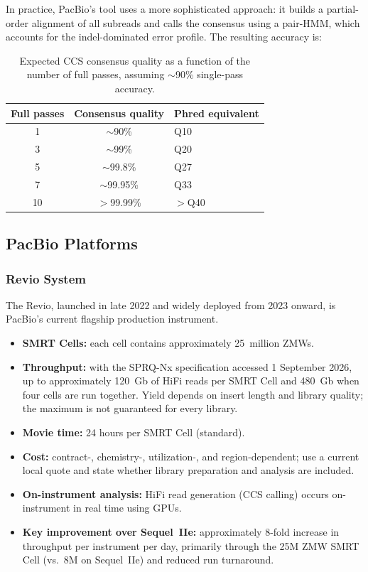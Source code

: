 In practice, PacBio's  tool uses a more sophisticated approach: it builds a partial-order alignment of all subreads and calls the consensus using a pair-HMM, which accounts for the indel-dominated error profile. The resulting accuracy is:

\begin{table}[htbp]
\centering
\caption[CCS accuracy vs.\ number of passes.]{Expected CCS consensus quality as a function of the number of full passes, assuming $\sim$90\% single-pass accuracy.}
\label{tab:longread:ccs-passes}
\small
\begin{tabular}{ccl}
\toprule
\textbf{Full passes} & \textbf{Consensus quality} & \textbf{Phred equivalent} \\
\midrule
1 & $\sim$90\% & Q10 \\
3 & $\sim$99\% & Q20 \\
5 & $\sim$99.8\% & Q27 \\
7 & $\sim$99.95\% & Q33 \\
10 & $>$99.99\% & $>$Q40 \\
\bottomrule
\end{tabular}
\end{table}


\subsection{PacBio Platforms}

\subsubsection{Revio System}

The Revio, launched in late 2022 and widely deployed from 2023 onward, is PacBio's current flagship production instrument.

\begin{itemize}[nosep]
  \item \textbf{SMRT Cells:} each cell contains approximately 25~million ZMWs.
  \item \textbf{Throughput:} with the SPRQ-Nx specification accessed 1 September 2026, up to approximately 120~Gb of HiFi reads per SMRT Cell and 480~Gb when four cells are run together. Yield depends on insert length and library quality; the maximum is not guaranteed for every library.
  \item \textbf{Movie time:} 24 hours per SMRT Cell (standard).
  \item \textbf{Cost:} contract-, chemistry-, utilization-, and region-dependent; use a current local quote and state whether library preparation and analysis are included.
  \item \textbf{On-instrument analysis:} HiFi read generation (CCS calling) occurs on-instrument in real time using GPUs.
  \item \textbf{Key improvement over Sequel~IIe:} approximately 8-fold increase in throughput per instrument per day, primarily through the 25M ZMW SMRT Cell (vs.\ 8M on Sequel~IIe) and reduced run turnaround.
\end{itemize}

